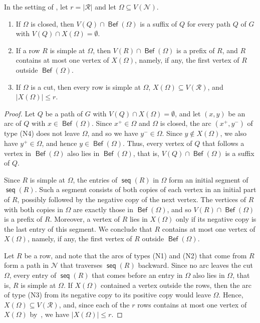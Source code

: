 \documentclass[fontsize=12pt,leading=14pt]{fullpaper}
\DeclareMathOperator{\Bef}{\mathsf{Bef}}
\DeclareMathOperator{\seq}{\mathsf{seq}}
\newcommand{\Ncal}{\mathcal{N}}
\newcommand{\Rcal}{\mathcal{R}}
\begin{document}
\begin{lemma}\label{lem:order-at-cut}
  In the setting of , let $r=|\Rcal|$ and let $\Omega\subseteq V(\Ncal)$.
  \begin{enumerate}[label=\textnormal{(\roman*)}]
    \item\label{item:oc-suffix} If $\Omega$ is closed, then $V(Q)\cap\Bef(\Omega)$ is a suffix of $Q$ for every path $Q$ of $G$ with $V(Q)\cap X(\Omega)=\emptyset$.
    \item\label{item:oc-row} If a row $R$ is simple at $\Omega$, then $V(R)\cap\Bef(\Omega)$ is a prefix of $R$, and $R$ contains at most one vertex of $X(\Omega)$, namely, if any, the first vertex of $R$ outside $\Bef(\Omega)$.
    \item\label{item:oc-cut} If $\Omega$ is a cut, then every row is simple at $\Omega$, $X(\Omega)\subseteq V(\Rcal)$, and $|X(\Omega)|\le r$.
  \end{enumerate}
\end{lemma}

\begin{proof}
  Let $Q$ be a path of $G$ with $V(Q)\cap X(\Omega)=\emptyset$, and let $(x,y)$ be an arc of $Q$ with $x\in\Bef(\Omega)$.
  Since $x^+\in\Omega$ and $\Omega$ is closed, the arc $(x^+,y^-)$ of type (N4) does not leave $\Omega$, and so we have $y^-\in\Omega$.
  Since $y\notin X(\Omega)$, we also have $y^+\in\Omega$, and hence $y\in\Bef(\Omega)$.
  Thus, every vertex of $Q$ that follows a vertex in $\Bef(\Omega)$ also lies in $\Bef(\Omega)$, that is, $V(Q)\cap\Bef(\Omega)$ is a suffix of $Q$.

  Since $R$ is simple at $\Omega$, the entries of $\seq(R)$ in $\Omega$ form an initial segment of $\seq(R)$.
  Such a segment consists of both copies of each vertex in an initial part of $R$, possibly followed by the negative copy of the next vertex.
  The vertices of $R$ with both copies in $\Omega$ are exactly those in $\Bef(\Omega)$, and so $V(R)\cap\Bef(\Omega)$ is a prefix of $R$.
  Moreover, a vertex of $R$ lies in $X(\Omega)$ only if its negative copy is the last entry of this segment.
  We conclude that $R$ contains at most one vertex of $X(\Omega)$, namely, if any, the first vertex of $R$ outside $\Bef(\Omega)$.

  Let $R$ be a row, and note that the arcs of types (N1) and (N2) that come from $R$ form a path in $\Ncal$ that traverses $\seq(R)$ backward.
  Since no arc leaves the cut $\Omega$, every entry of $\seq(R)$ that comes before an entry in $\Omega$ also lies in $\Omega$, that is, $R$ is simple at $\Omega$.
  If $X(\Omega)$ contained a vertex outside the rows, then the arc of type (N3) from its negative copy to its positive copy would leave $\Omega$.
  Hence, $X(\Omega)\subseteq V(\Rcal)$, and, since each of the $r$ rows contains at most one vertex of $X(\Omega)$ by~, we have $|X(\Omega)|\le r$.
\end{proof}
\end{document}
